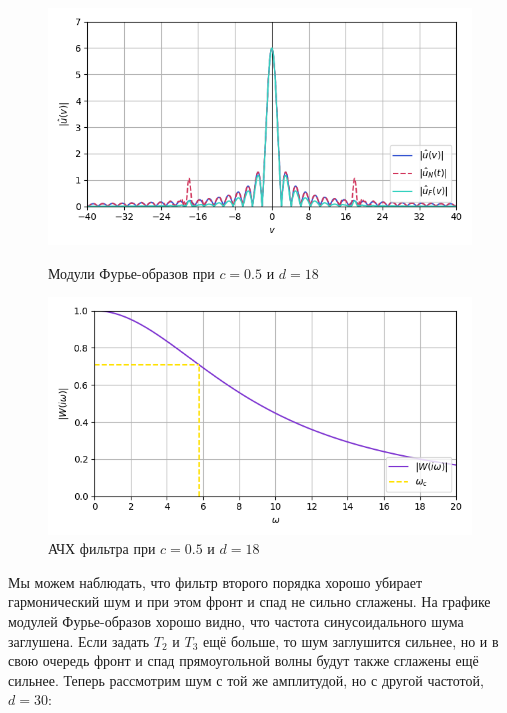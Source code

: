 \documentclass[a4paper]{article}
\begin{document}
\begin{figure}[H]
    \begin{minipage}{0.49\textwidth}
        \centering \includegraphics[width=\textwidth]{sources/second/part2/c=0.5_d=18 T1=1e-08_T2=0.111_T3=0.111/2_fft_cmp.png}
        \caption{Модули Фурье-образов при $c = 0.5$ и $d = 18$}
    \end{minipage}\hfill
    \begin{minipage}{0.49\textwidth}
        \centering \includegraphics[width=\textwidth]{sources/second/part2/c=0.5_d=18 T1=1e-08_T2=0.111_T3=0.111/3_filter.png}
        \caption{АЧХ фильтра при $c = 0.5$ и $d = 18$}
    \end{minipage}
\end{figure}
Мы можем наблюдать, что фильтр второго порядка хорошо убирает гармонический шум и при этом фронт и спад не сильно сглажены. На графике модулей Фурье-образов хорошо видно, что частота синусоидального шума заглушена. Если задать $T_2$ и $T_3$ ещё больше, то шум заглушится сильнее, но и в свою очередь фронт и спад прямоугольной волны будут также сглажены ещё сильнее.\newpage
Теперь рассмотрим шум с той же амплитудой, но с другой частотой, $d = 30$:
\end{document}
